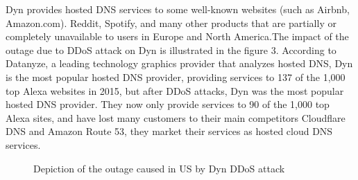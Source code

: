 \documentclass[conference]{IEEEtran}
\begin{document}
\begin{itemize}
{Dyn provides hosted DNS services to some well-known websites (such as Airbnb, Amazon.com). Reddit, Spotify, and many other products that are partially or completely unavailable to users in Europe and North America.The impact of the outage due to DDoS attack on Dyn is illustrated in
the figure 3. According to Datanyze, a leading technology graphics provider that analyzes hosted DNS, Dyn is the most popular hosted DNS provider, providing services to 137 of the 1,000 top Alexa websites in 2015, but after DDoS attacks, Dyn was the most popular hosted DNS provider. They now only provide services to 90 of the 1,000 top Alexa sites, and have lost many customers to their main competitors Cloudflare DNS and Amazon Route 53, they market their services as hosted cloud DNS services.


\begin{figure}[htbp]
{}
\caption{Depiction of the outage caused in US by Dyn DDoS attack \cite{b2}}
\label{fig}
\end{figure}
}


\end{itemize}
\end{document}
